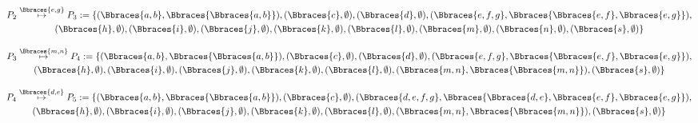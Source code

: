 \begin{solution}
\begin{enumerate}[label = \arabic*.]
    \begin{center}
        
    \end{center}

    \begin{multline*}
        P_2
        \stackrel
        {
            \Bbraces{e, g}
        }{
            \mapsto
        }
        P_3 :=
        \{
            (\Bbraces{a, b}, \Bbraces{\Bbraces{a, b}}),
            (\Bbraces{c}, \emptyset),
            (\Bbraces{d}, \emptyset),
            (\Bbraces{e, f, g}, \Bbraces{\Bbraces{e, f}, \Bbraces{e, g}}), \\
            (\Bbraces{h}, \emptyset),
            (\Bbraces{i}, \emptyset),
            (\Bbraces{j}, \emptyset),
            (\Bbraces{k}, \emptyset),
            (\Bbraces{l}, \emptyset),
            (\Bbraces{m}, \emptyset),
            (\Bbraces{n}, \emptyset),
            (\Bbraces{s}, \emptyset)
        \}
    \end{multline*}

    \begin{center}
        
    \end{center}

    \begin{multline*}
        P_3
        \stackrel
        {
            \Bbraces{m, n}
        }{
            \mapsto
        }
        P_4 :=
        \{
            (\Bbraces{a, b}, \Bbraces{\Bbraces{a, b}}),
            (\Bbraces{c}, \emptyset),
            (\Bbraces{d}, \emptyset),
            (\Bbraces{e, f, g}, \Bbraces{\Bbraces{e, f}, \Bbraces{e, g}}), \\
            (\Bbraces{h}, \emptyset),
            (\Bbraces{i}, \emptyset),
            (\Bbraces{j}, \emptyset),
            (\Bbraces{k}, \emptyset),
            (\Bbraces{l}, \emptyset),
            (\Bbraces{m, n}, \Bbraces{\Bbraces{m, n}}),
            (\Bbraces{s}, \emptyset)
        \}
    \end{multline*}

    \begin{center}
        
    \end{center}

    \begin{multline*}
        P_4
        \stackrel
        {
            \Bbraces{d, e}
        }{
            \mapsto
        }
        P_5 :=
        \{
            (\Bbraces{a, b}, \Bbraces{\Bbraces{a, b}}),
            (\Bbraces{c}, \emptyset),
            (\Bbraces{d, e, f, g}, \Bbraces{\Bbraces{d, e}, \Bbraces{e, f}, \Bbraces{e, g}}), \\
            (\Bbraces{h}, \emptyset),
            (\Bbraces{i}, \emptyset),
            (\Bbraces{j}, \emptyset),
            (\Bbraces{k}, \emptyset),
            (\Bbraces{l}, \emptyset),
            (\Bbraces{m, n}, \Bbraces{\Bbraces{m, n}}),
            (\Bbraces{s}, \emptyset)
        \}
    \end{multline*}


\end{enumerate}
\end{solution}
